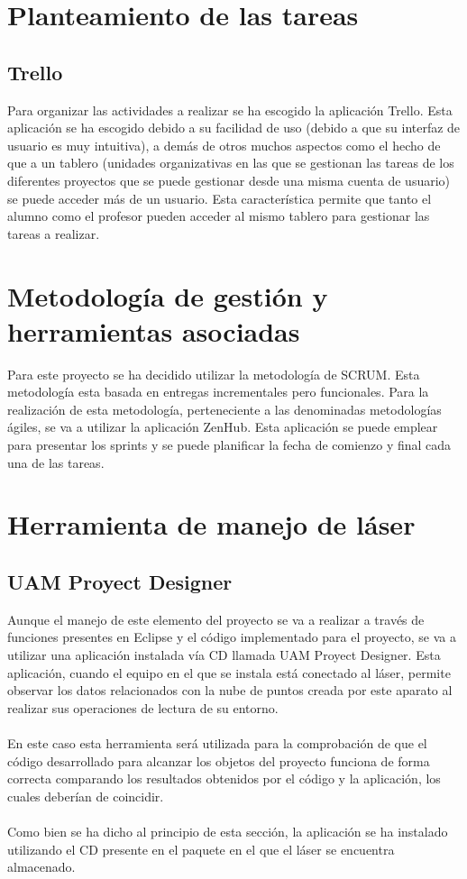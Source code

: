 \section{Planteamiento de las tareas}

\subsection{Trello}
Para organizar las actividades a realizar se ha escogido la aplicación Trello. Esta aplicación se ha escogido debido a su facilidad de uso (debido a que su interfaz de usuario es muy intuitiva), a demás de otros muchos aspectos como el hecho de que a un tablero (unidades organizativas en las que se gestionan las tareas de los diferentes proyectos que se puede gestionar desde una misma cuenta de usuario) se puede acceder más de un usuario. Esta característica permite que tanto el alumno como el profesor pueden acceder al mismo tablero para gestionar las tareas a realizar.\\

\section{Metodología de gestión y herramientas asociadas}

Para este proyecto se ha decidido utilizar la metodología de SCRUM. Esta metodología esta basada en entregas incrementales pero funcionales. Para la realización de esta metodología, perteneciente a las denominadas metodologías ágiles, se va a utilizar la aplicación ZenHub. Esta aplicación se puede emplear para presentar los sprints y se puede planificar la fecha de comienzo y final cada una de las tareas.

\section{Herramienta de manejo de láser}

\subsection{ UAM Proyect Designer}
Aunque el manejo de este elemento del proyecto se va a realizar a través de funciones presentes en Eclipse y el código implementado para el proyecto, se va a utilizar una aplicación instalada vía CD llamada UAM Proyect Designer. Esta aplicación, cuando el equipo en el que se instala está conectado al láser, permite observar los datos relacionados con la nube de puntos creada por este aparato al realizar sus operaciones de lectura de su entorno.\\
\\
En este caso esta herramienta será utilizada para la comprobación de que el código desarrollado para alcanzar los objetos del proyecto funciona de forma correcta comparando los resultados obtenidos por el código y la aplicación, los cuales deberían de coincidir.\\
\\
Como bien se ha dicho al principio de esta sección, la aplicación se ha instalado utilizando el CD presente en el paquete en el que el láser se encuentra almacenado. 

